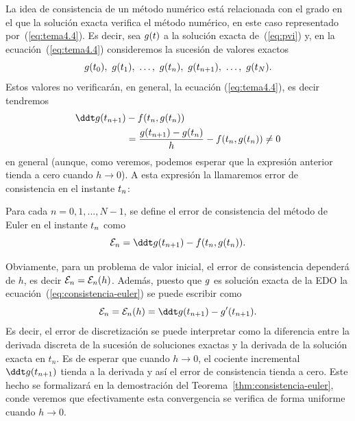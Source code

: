 La idea de consistencia de un método numérico está relacionada con el
grado en el que la solución exacta verifica el método numérico, en este caso representado por~(\ref{eq:tema4.4}). Es decir,
sea $g(t)$ a la solución exacta de~(\ref{eq:pvi}) y, en la
ecuación~(\ref{eq:tema4.4}) consideremos la sucesión de valores exactos
$$
g(t_0),\ g(t_1),\ \dots,\ g({t_n}),\ g({t_{n+1}}),\ \dots,\ g(t_N).
$$
Estos valores no verificarán, en general, la ecuación
(\ref{eq:tema4.4}), es decir tendremos
\begin{align*}
  \ddt \sol(\tnn) &- f(\tn,\sol(\tn))
  \\
  &= \frac{\sol(\tnn)-\sol(\tn)}{h}
  - f(\tn,\sol(\tn))
    \neq 0
\end{align*}
en general (aunque, como veremos, podemos esperar que la expresión anterior tienda a cero cuando $h\to 0$).
A esta expresión la llamaremos error de consistencia en el instante ${t_n}$:
\begin{definition}
  \label{def:error-consistencia-euler}
  Para cada $n=0,1,...,N-1$, se define el error de consistencia del método de
  Euler en el instante ${t_n}$ como
  \begin{equation}
    \label{eq:consistencia-euler}
    \errCons_{n} = \ddt \sol(\tnn)-f(\tn,\sol(\tn)).
  \end{equation}
\end{definition}
\begin{remark}
  Obviamente, para un problema de valor inicial, el error de
  consistencia dependerá de $h$, es decir ${\cal E}_n={\cal E}_n(h)$.
  Además, puesto que $g$ es solución exacta de la EDO la
  ecuación~(\ref{eq:consistencia-euler}) se puede escribir como
  $$\errCons_{n} = \errCons_{n}(h) = \ddt \sol(\tnn)-\sol'(\tnn).$$
  Es decir, el error de discretización se puede interpretar como la
  diferencia entre la derivada discreta de la sucesión de soluciones
  exactas y la derivada de la solución exacta en $t_n$.  Es de esperar
  que cuando $h\to 0$, el cociente incremental $\ddt \sol(\tnn)$
  tienda a la derivada y así el error de consistencia tienda a
  cero. Este hecho se formalizará en la demostración del
  Teorema~\ref{thm:consistencia-euler}, conde veremos que
  efectivamente esta convergencia se verifica de forma uniforme cuando
  $h\to 0$.
\end{remark}

